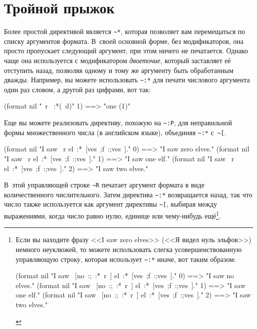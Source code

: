\section{Тройной прыжок}

Более простой директивой является \lstinline!~*!, которая позволяет вам перемещаться по
списку аргументов формата. В~своей основной форме, без модификаторов, она прос\-то
пропускает следующий аргумент, при этом ничего не печатается. Однако чаще она используется
с модификатором \textit{двоеточие}, который заставляет её отступить назад, позволяя одному
и тому же аргументу быть обработанным дважды. Например, вы можете использовать
\lstinline!~:*! для печати числового аргумента один раз словом, а другой раз цифрами, вот
так:

\begin{myverb}
(format nil "~r ~:*(~d)" 1) ==> "one (1)"
\end{myverb}

Еще вы можете реализовать директиву, похожую на \lstinline!~:P!, для неправильной формы множественного числа (в английском
языке), объединяя \lstinline!~:*! с~\lstinline!~[!.

\begin{myverb}
(format nil "I saw ~r el~:*~[ves~;f~:;ves~]." 0) ==> "I saw zero elves."
(format nil "I saw ~r el~:*~[ves~;f~:;ves~]." 1) ==> "I saw one elf."
(format nil "I saw ~r el~:*~[ves~;f~:;ves~]." 2) ==> "I saw two elves."
\end{myverb}

В~этой управляющей строке \lstinline!~R! печатает аргумент формата в виде количественного числительного. Затем директива
\lstinline!~:*! возвращается назад, так что число также используется как аргумент директивы \lstinline!~[!, выбирая между
выражениями, когда число равно нулю, единице или чему-нибудь ещё\footnote{Если вы находите фразу <<I saw zero elves>>
(<<Я видел нуль эльфов>>) немного неуклюжей, то можете использовать слегка усовершенствованную управляющую строку,
которая использует \lstinline!~:*! иначе, вот таким образом:

\begin{myverb}
(format nil "I saw ~[no~:;~:*~r~] el~:*~[ves~;f~:;ves~]." 0) ==> "I saw no elves."
(format nil "I saw ~[no~:;~:*~r~] el~:*~[ves~;f~:;ves~]." 1) ==> "I saw one elf."
(format nil "I saw ~[no~:;~:*~r~] el~:*~[ves~;f~:;ves~]." 2) ==> "I saw two elves."
\end{myverb}
}\hspace{\footnotenegspace}.

